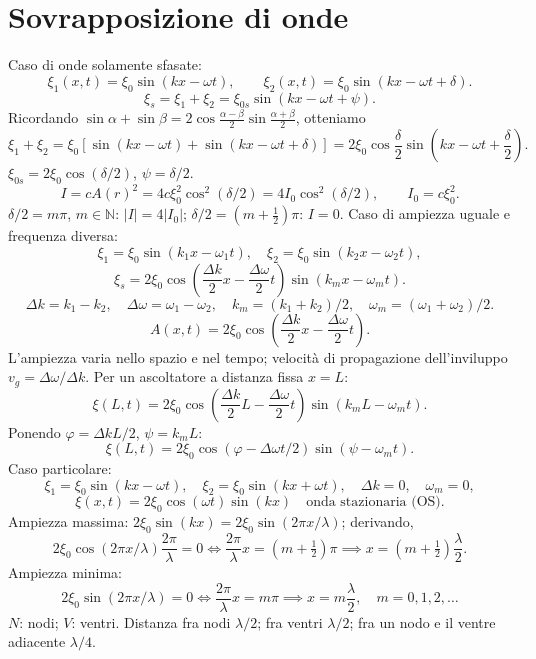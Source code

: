 \documentclass[11pt,a4paper]{article}
\newcommand{\pagina}[1]{\clearpage}
\begin{document}
\section*{Sovrapposizione di onde}
Caso di onde solamente sfasate:
\[\xi_1(x,t)=\xi_0\sin(kx-\omega t),\qquad\xi_2(x,t)=\xi_0\sin(kx-\omega t+\delta).\]
\[\xi_s=\xi_1+\xi_2=\xi_{0s}\sin(kx-\omega t+\psi).\]
Ricordando $\sin\alpha+\sin\beta=2\cos\frac{\alpha-\beta}2\sin\frac{\alpha+\beta}2$, otteniamo
\[\xi_1+\xi_2=\xi_0[\sin(kx-\omega t)+\sin(kx-\omega t+\delta)]
=2\xi_0\cos\frac\delta2\sin\left(kx-\omega t+\frac\delta2\right).\]
$\xi_{0s}=2\xi_0\cos(\delta/2)$, $\psi=\delta/2$.
\[I=cA(r)^2=4c\xi_0^2\cos^2(\delta/2)=4I_0\cos^2(\delta/2),\qquad I_0=c\xi_0^2.\]
$\delta/2=m\pi$, $m\in\mathbb N$: $|I|=4|I_0|$; $\delta/2=(m+\tfrac12)\pi$: $I=0$.
Caso di ampiezza uguale e frequenza diversa:
\[\xi_1=\xi_0\sin(k_1x-\omega_1t),\quad\xi_2=\xi_0\sin(k_2x-\omega_2t),\]
\[\xi_s=2\xi_0\cos\left(\frac{\Delta k}2x-\frac{\Delta\omega}2t\right)\sin(k_mx-\omega_mt).\]
\pagina{12}
\[\Delta k=k_1-k_2,\quad\Delta\omega=\omega_1-\omega_2,\quad k_m=(k_1+k_2)/2,\quad\omega_m=(\omega_1+\omega_2)/2.\]
\[A(x,t)=2\xi_0\cos\left(\frac{\Delta k}2x-\frac{\Delta\omega}2t\right).\]
L'ampiezza varia nello spazio e nel tempo; velocità di propagazione dell'inviluppo $v_g=\Delta\omega/\Delta k$.
Per un ascoltatore a distanza fissa $x=L$:
\[\xi(L,t)=2\xi_0\cos\left(\frac{\Delta k}2L-\frac{\Delta\omega}2t\right)\sin(k_mL-\omega_mt).\]
Ponendo $\varphi=\Delta kL/2$, $\psi=k_mL$:
\[\xi(L,t)=2\xi_0\cos(\varphi-\Delta\omega t/2)\sin(\psi-\omega_mt).\]
Caso particolare:
\[\xi_1=\xi_0\sin(kx-\omega t),\quad\xi_2=\xi_0\sin(kx+\omega t),\quad\Delta k=0,\quad\omega_m=0,\]
\[\xi(x,t)=2\xi_0\cos(\omega t)\sin(kx)\quad\text{onda stazionaria (OS)}.\]
Ampiezza massima: $2\xi_0\sin(kx)=2\xi_0\sin(2\pi x/\lambda)$; derivando,
\[2\xi_0\cos(2\pi x/\lambda)\frac{2\pi}\lambda=0\iff\frac{2\pi}\lambda x=(m+\tfrac12)\pi\implies x=(m+\tfrac12)\frac\lambda2.\]
Ampiezza minima:
\[2\xi_0\sin(2\pi x/\lambda)=0\iff\frac{2\pi}\lambda x=m\pi\implies x=m\frac\lambda2,\quad m=0,1,2,\ldots\]
\pagina{13}
$N$: nodi; $V$: ventri. Distanza fra nodi $\lambda/2$; fra ventri $\lambda/2$; fra un nodo e il ventre adiacente $\lambda/4$.
\begin{center}\end{center}
\end{document}
